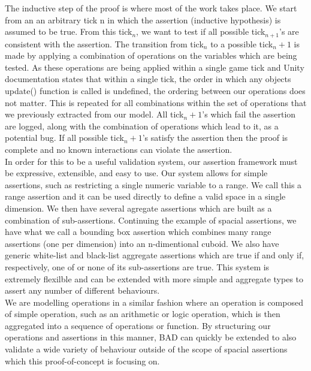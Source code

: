 \documentclass[letterpaper,twocolumn,10pt]{article}
\begin{document}
The inductive step of the proof is where most of the work takes place. We start from an an arbitrary tick n in which the assertion (inductive hypothesis) is assumed to be true. From this tick$_n$, we want to test if all possible tick$_{n+1}$'s are consistent with the assertion. The transition from tick$_n$ to a possible tick$_n+1$ is made by applying a combination of operations on the variables which are being tested. As these operations are being applied within a single game tick and Unity documentation states that within a single tick, the order in which any objects update() function is called is undefined, the ordering between our operations does not matter. This is repeated for all combinations within the set of operations that we previously extracted from our model. All tick$_n+1$'s which fail the assertion are logged, along with the combination of operations which lead to it, as a potential bug. If all possible tick$_n+1$'s satisfy the assertion then the proof is complete and no known interactions can violate the assertion. \\

In order for this to be a useful validation system, our assertion framework must be expressive, extensible, and easy to use. Our system allows for simple assertions, such as restricting a single numeric variable to a range. We call this a range assertion and it can be used directly to define a valid space in a single dimension. We then have several agregate assertions which are built as a combination of sub-assertions. Continuing the example of spacial assertions, we have what we call a bounding box assertion which combines many range assertions (one per dimension) into an n-dimentional cuboid. We also have generic white-list and black-list aggregate assertions which are true if and only if, respectively, one of or none of its sub-assertions are true. This system is extremely flexilble and can be extended with more simple and aggregate types to assert any number of different behaviours. \\

We are modelling operations in a similar fashion where an operation is composed of simple operation, such as an arithmetic or logic operation, which is then aggregated into a sequence of operations or function. By structuring our operations and assertions in this manner, BAD can quickly be extended to also validate a wide variety of behaviour outside of the scope of spacial assertions which this proof-of-concept is focusing on. \\
\end{document}
